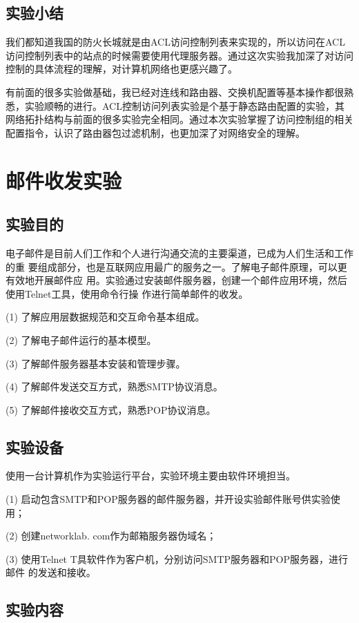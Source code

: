 \documentclass[lang=cn,11pt,a4paper,cite=authoryear]{elegantpaper}
\begin{document}
\subsection{实验小结}

我们都知道我国的防火长城就是由ACL访问控制列表来实现的，所以访问在ACL访问控制列表中的站点的时候需要使用代理服务器。通过这次实验我加深了对访问控制的具体流程的理解，对计算机网络也更感兴趣了。

有前面的很多实验做基础，我已经对连线和路由器、交换机配置等基本操作都很熟悉，实验顺畅的进行。ACL控制访问列表实验是个基于静态路由配置的实验，其网络拓扑结构与前面的很多实验完全相同。通过本次实验掌握了访问控制组的相关配置指令，认识了路由器包过滤机制，也更加深了对网络安全的理解。

\section{邮件收发实验}
\subsection{实验目的}

电子邮件是目前人们工作和个人进行沟通交流的主要渠道，已成为人们生活和工作的重 要组成部分，也是互联网应用最广的服务之一。了解电子邮件原理，可以更有效地开展邮件应 用。实验通过安装邮件服务器，创建一个邮件应用环境，然后使用Telnet工具，使用命令行操 作进行简单邮件的收发。

(1)	了解应用层数据规范和交互命令基本组成。

(2)	了解电子邮件运行的基本模型。

(3)	了解邮件服务器基本安装和管理步骤。

(4)	了解邮件发送交互方式，熟悉SMTP协议消息。

(5)	了解邮件接收交互方式，熟悉POP协议消息。

\subsection{实验设备}

使用一台计算机作为实验运行平台，实验环境主要由软件环境担当。

(1)	启动包含SMTP和POP服务器的邮件服务器，并开设实验邮件账号供实验使用；

(2)	创建networklab. com作为邮箱服务器伪域名；

(3)	使用Telnet T具软件作为客户机，分别访问SMTP服务器和POP服务器，进行邮件 的发送和接收。

\subsection{实验内容}
\end{document}
